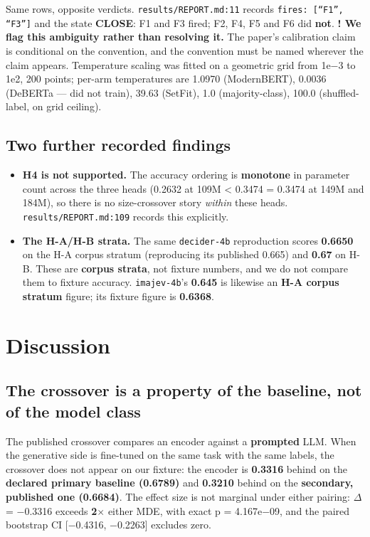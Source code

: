 \documentclass[11pt,a4paper]{article}
\begin{document}
Same rows, opposite verdicts. \texttt{results/REPORT.md:11} records \texttt{fires: [``F1'', ``F3'']} and the state \textbf{CLOSE}: F1 and F3 fired; F2, F4, F5 and F6 did \textbf{not}. \textbf{! We flag this ambiguity rather than resolving it.} The paper's calibration claim is conditional on the convention, and the convention must be named wherever the claim appears. Temperature scaling was fitted on a geometric grid from 1e$-$3 to 1e2, 200 points; per-arm temperatures are 1.0970 (ModernBERT), 0.0036 (DeBERTa --- did not train), 39.63 (SetFit), 1.0 (majority-class), 100.0 (shuffled-label, on grid ceiling).

\subsection{Two further recorded findings}

\begin{itemize}
\item \textbf{H4 is not supported.} The accuracy ordering is \textbf{monotone} in parameter count across the three heads (0.2632 at 109M < 0.3474 = 0.3474 at 149M and 184M), so there is no size-crossover story \emph{within} these heads. \texttt{results/REPORT.md:109} records this explicitly.
\item \textbf{The H-A/H-B strata.} The same \texttt{decider-4b} reproduction scores \textbf{0.6650} on the H-A corpus stratum (reproducing its published 0.665) and \textbf{0.67} on H-B. These are \textbf{corpus strata}, not fixture numbers, and we do not compare them to fixture accuracy. \texttt{imajev-4b}'s \textbf{0.645} is likewise an \textbf{H-A corpus stratum} figure; its fixture figure is \textbf{0.6368}.
\end{itemize}

\section{Discussion}

\subsection{The crossover is a property of the baseline, not of the model class}

The published crossover compares an encoder against a \textbf{prompted} LLM. When the generative side is fine-tuned on the same task with the same labels, the crossover does not appear on our fixture: the encoder is \textbf{0.3316} behind on the \textbf{declared primary baseline (0.6789)} and \textbf{0.3210} behind on the \textbf{secondary, published one (0.6684)}. The effect size is not marginal under either pairing: $\Delta$ = $-$0.3316 exceeds \textbf{2$\times$} either MDE, with exact p = 4.167e$-$09, and the paired bootstrap CI [$-$0.4316, $-$0.2263] excludes zero.
\end{document}
